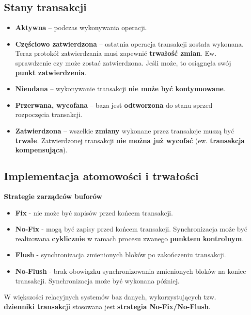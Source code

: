 \documentclass[a4paper]{article}
\begin{document}
\subsection{Stany transakcji}
\begin{itemize}
    \item \textbf{Aktywna} – podczas wykonywania operacji.
    \item \textbf{Częściowo zatwierdzona} – ostatnia operacja transakcji została wykonana. Teraz protokół zatwierdzania musi zapewnić \textbf{trwałość zmian}. Ew. sprawdzenie czy może zostać zatwierdzona. Jeśli może, to osiągnęła swój \textbf{punkt zatwierdzenia}.
    
    \item \textbf{Nieudana} – wykonywanie transakcji \textbf{nie może być kontynuowane}.
    
    \item \textbf{Przerwana, wycofana} – baza jest \textbf{odtworzona} do stanu sprzed rozpoczęcia transakcji.
    \item \textbf{Zatwierdzona} – wszelkie \textbf{zmiany} wykonane przez transakcje muszą być \textbf{trwałe}. Zatwierdzonej transakcji \textbf{nie można już wycofać} (ew. \textbf{transakcja kompensująca}).
\end{itemize}

\subsection{Implementacja atomowości i trwałości}
\textbf{Strategie zarządców buforów}

\begin{itemize}
    \item \textbf{Fix} - nie może być zapisów przed końcem transakcji.
    \item \textbf{No-Fix} - mogą być zapisy przed końcem transakcji. Synchronizacja może być realizowana \textbf{cyklicznie} w ramach procesu zwanego \textbf{punktem kontrolnym}.\\
    
    \item \textbf{Flush} - synchronizacja zmienionych bloków po zakończeniu transakcji. 
    \item \textbf{No-Flush} - brak obowiązku synchronizowania zmienionych bloków na koniec transakcji. Synchronizacja może być wykonana później.
\end{itemize}
W większości relacyjnych systemów baz danych, wykorzystujących tzw. \textbf{dzienniki transakcji} stosowana jest \textbf{strategia No-Fix/No-Flush}.
\end{document}
